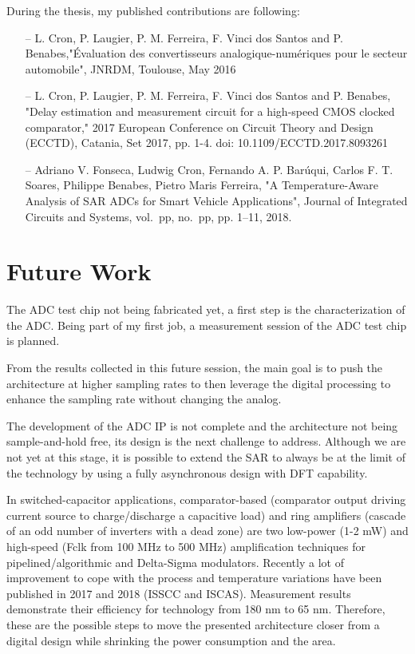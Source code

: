 During the thesis, my published contributions are following:
\begin{itemize}
	\item[--] L. Cron, P. Laugier, P. M. Ferreira, F. Vinci dos Santos and P. Benabes,"Évaluation des convertisseurs analogique-numériques pour le secteur automobile", JNRDM, Toulouse, May 2016
	\item[--] L. Cron, P. Laugier, P. M. Ferreira, F. Vinci dos Santos and P. Benabes, "Delay estimation and measurement circuit for a high-speed CMOS clocked comparator," 2017 European Conference on Circuit Theory and Design (ECCTD), Catania, Set 2017, pp. 1-4. doi: 10.1109/ECCTD.2017.8093261
	\item[--] Adriano V. Fonseca, Ludwig Cron, Fernando A. P. Barúqui, Carlos F. T. Soares, Philippe Benabes, Pietro Maris Ferreira, "A Temperature-Aware Analysis of SAR ADCs for Smart Vehicle Applications", Journal of Integrated Circuits and Systems, vol.~pp, no.~pp, pp. 1--11, 2018.
\end{itemize}

\clearpage
\section{Future Work}          %
The ADC test chip not being fabricated yet, a first step is the characterization of the ADC\@. Being part of my first job, a measurement session of the ADC test chip is planned.

From the results collected in this future session, the main goal is to push the architecture at higher sampling rates to then leverage the digital processing to enhance the sampling rate without changing the analog.

The development of the ADC IP is not complete and the architecture not being sample-and-hold free, its design is the next challenge to address. Although we are not yet at this stage, it is possible to extend the SAR to always be at the limit of the technology by using a fully asynchronous design with DFT capability.

In switched-capacitor applications, comparator-based (comparator output driving current source to charge/discharge a capacitive load) and ring amplifiers (cascade of an odd number of inverters with a dead zone) are two low-power (1-2 mW) and high-speed (Fclk from 100 MHz to 500 MHz) amplification techniques for pipelined/algorithmic and Delta-Sigma modulators. Recently a lot of improvement to cope with the process and temperature variations have been published in 2017 and 2018 (ISSCC and ISCAS). Measurement results demonstrate their efficiency for technology from 180 nm to 65 nm. Therefore, these are the possible steps to move the presented architecture closer from a digital design while shrinking the power consumption and the area.

